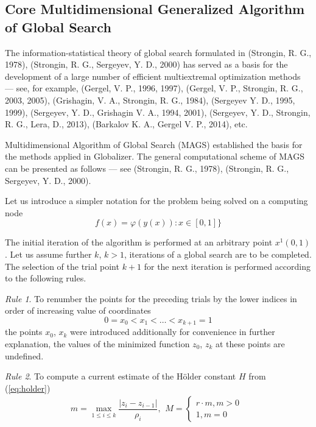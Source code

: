 \documentclass{gOMS2e}
\theoremstyle{plain}%
\theoremstyle{definition}
\theoremstyle{remark}
\begin{document}
\subsection{Core Multidimensional Generalized Algorithm of Global Search}
\label{subsec:corepar}
The information-statistical theory of global search formulated in (Strongin, R. G., 1978), (Strongin, R. G., Sergeyev, Y. D., 2000)
has served as a basis for the development of a large number of efficient multiextremal
optimization methods --- see, for example, (Gergel, V. P., 1996, 1997), (Gergel, V. P., Strongin, R. G., 2003, 2005), (Grishagin, V. A., Strongin, R. G., 1984), (Sergeyev Y. D., 1995, 1999), (Sergeyev, Y. D., Grishagin V. A., 1994, 2001), (Sergeyev, Y. D., Strongin, R. G., Lera, D., 2013), (Barkalov K. A., Gergel V. P., 2014), etc.
\par
Multidimensional Algorithm of Global Search (MAGS) established the basis for the
methods applied in Globalizer. The general computational scheme of MAGS can be
presented as follows --- see (Strongin, R. G., 1978), (Strongin, R. G., Sergeyev, Y. D., 2000).
\par
Let us introduce a simpler notation for the problem being solved on a computing node
\begin{equation}
\label{eq:oneDimFunc}
f(x) = \varphi(y(x)):x\in [0,1]\}
\end{equation}
\par
The initial iteration of the algorithm is performed at an arbitrary point \(x^1(0,1)\).
Let us assume further \(k\), \(k>1\), iterations of a global search are to be completed.
The selection of the trial point \(k+1\) for the next iteration is performed according to the following rules.
\par
\textit{Rule 1}. To renumber the points for the preceding trials by the lower indices in order of increasing value of coordinates
\begin{equation}
  \label{step1}
0=x_0<x_1<\dotsc<x_{k+1}=1
\end{equation}
the points \(x_0\), \(x_k\) were introduced additionally for convenience in further explanation,
the values of the minimized function \(z_0\), \(z_k\) at these points are undefined.
\par
\textit{Rule 2}. To compute a current estimate of the Hölder constant \(H\) from (\ref{eq:holder})
\begin{equation}
  \label{step2}
m=\max_{1\leqslant i\leqslant k}\dfrac{|z_i-z_{i-1}|}{\rho_i},
\begin{matrix}
    M =
    \left\{
    \begin{matrix}
    r\cdot m,m>0 \\
    1,m=0
    \end{matrix} \right.
    \end{matrix}
\end{equation}
\end{document}

